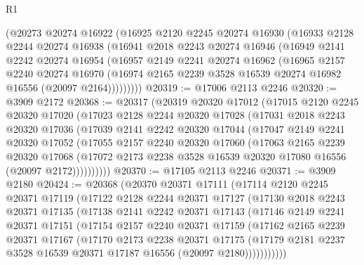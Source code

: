 \begin{lexlean}{R1}
\begin{coremodule}
    (@20273
      @20274
      @16922
      (@16925
        @2120
        @2245
        @20274
        @16930
        (@16933
          @2128
          @2244
          @20274
          @16938
          (@16941
            @2018
            @2243
            @20274
            @16946
            (@16949
              @2141
              @2242
              @20274
              @16954
              (@16957
                @2149
                @2241
                @20274
                @16962
                (@16965
                  @2157
                  @2240
                  @20274
                  @16970
                  (@16974 @2165 @2239 @3528 @16539 @20274 @16982 @16556 (@20097 @2164)))))))))
@20319 := @17006 @2113 @2246
@20320 := @3909 @2172
@20368 := @20317
    (@20319
      @20320
      @17012
      (@17015
        @2120
        @2245
        @20320
        @17020
        (@17023
          @2128
          @2244
          @20320
          @17028
          (@17031
            @2018
            @2243
            @20320
            @17036
            (@17039
              @2141
              @2242
              @20320
              @17044
              (@17047
                @2149
                @2241
                @20320
                @17052
                (@17055
                  @2157
                  @2240
                  @20320
                  @17060
                  (@17063
                    @2165
                    @2239
                    @20320
                    @17068
                    (@17072 @2173 @2238 @3528 @16539 @20320 @17080 @16556 (@20097 @2172))))))))))
@20370 := @17105 @2113 @2246
@20371 := @3909 @2180
@20424 := @20368
    (@20370
      @20371
      @17111
      (@17114
        @2120
        @2245
        @20371
        @17119
        (@17122
          @2128
          @2244
          @20371
          @17127
          (@17130
            @2018
            @2243
            @20371
            @17135
            (@17138
              @2141
              @2242
              @20371
              @17143
              (@17146
                @2149
                @2241
                @20371
                @17151
                (@17154
                  @2157
                  @2240
                  @20371
                  @17159
                  (@17162
                    @2165
                    @2239
                    @20371
                    @17167
                    (@17170
                      @2173
                      @2238
                      @20371
                      @17175
                      (@17179 @2181 @2237 @3528 @16539 @20371 @17187 @16556 (@20097 @2180)))))))))))

\end{coremodule}
\end{lexlean}
